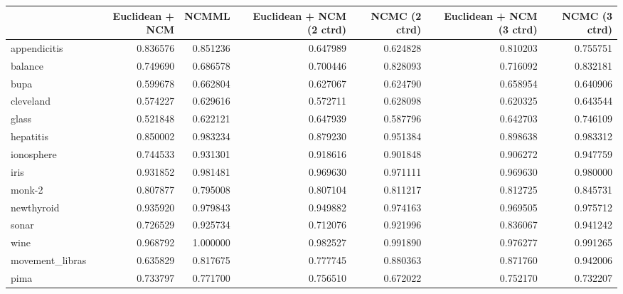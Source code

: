 \begin{tabular}{lrrrrrr}
\toprule
{} &  Euclidean + NCM &     NCMML &  Euclidean + NCM (2 ctrd) &  NCMC (2 ctrd) &  Euclidean + NCM (3 ctrd) &  NCMC (3 ctrd) \\
\midrule
appendicitis    &         0.836576 &  0.851236 &                  0.647989 &       0.624828 &                  0.810203 &       0.755751 \\
balance         &         0.749690 &  0.686578 &                  0.700446 &       0.828093 &                  0.716092 &       0.832181 \\
bupa            &         0.599678 &  0.662804 &                  0.627067 &       0.624790 &                  0.658954 &       0.640906 \\
cleveland       &         0.574227 &  0.629616 &                  0.572711 &       0.628098 &                  0.620325 &       0.643544 \\
glass           &         0.521848 &  0.622121 &                  0.647939 &       0.587796 &                  0.642703 &       0.746109 \\
hepatitis       &         0.850002 &  0.983234 &                  0.879230 &       0.951384 &                  0.898638 &       0.983312 \\
ionosphere      &         0.744533 &  0.931301 &                  0.918616 &       0.901848 &                  0.906272 &       0.947759 \\
iris            &         0.931852 &  0.981481 &                  0.969630 &       0.971111 &                  0.969630 &       0.980000 \\
monk-2          &         0.807877 &  0.795008 &                  0.807104 &       0.811217 &                  0.812725 &       0.845731 \\
newthyroid      &         0.935920 &  0.979843 &                  0.949882 &       0.974163 &                  0.969505 &       0.975712 \\
sonar           &         0.726529 &  0.925734 &                  0.712076 &       0.921996 &                  0.836067 &       0.941242 \\
wine            &         0.968792 &  1.000000 &                  0.982527 &       0.991890 &                  0.976277 &       0.991265 \\
movement\_libras &         0.635829 &  0.817675 &                  0.777745 &       0.880363 &                  0.871760 &       0.942006 \\
pima            &         0.733797 &  0.771700 &                  0.756510 &       0.672022 &                  0.752170 &       0.732207 \\

\end{tabular}
